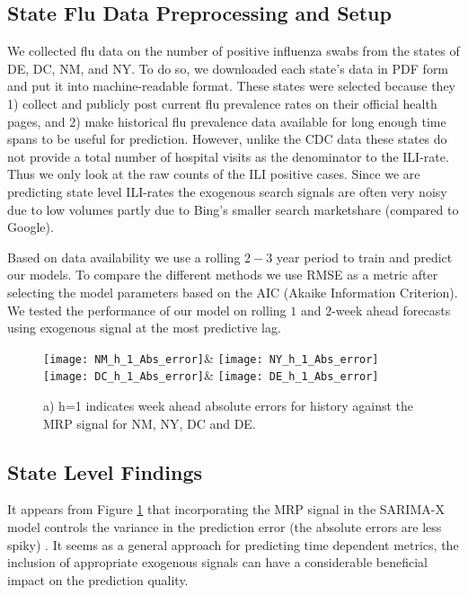 \documentclass[12pt]{article}
\begin{document}
\subsection{State Flu Data Preprocessing and Setup}

We collected flu data on the number of positive influenza swabs from the states of DE, DC, NM, and NY. To do so, we downloaded each state's data in PDF form and put it into machine-readable format. These states were selected because they 1) collect and publicly post current flu prevalence rates on their official health pages, and 2) make historical flu prevalence data available for long enough time spans to be useful for prediction. However, unlike the CDC data these states do not provide a total number of hospital visits as the denominator to the ILI-rate. Thus we only look at the raw counts of the ILI positive cases. Since we are predicting state level ILI-rates the exogenous search signals are often very noisy due to low volumes partly due to Bing's smaller search marketshare (compared to Google).

Based on data availability we use a rolling $2-3$ year period to train and predict our models. To compare the different methods we use RMSE as a metric after selecting the model parameters based on the AIC (Akaike Information Criterion). We tested the performance of our model on rolling $1$ and $2$-week ahead forecasts using exogenous signal at the most predictive lag.

\clearpage

\begin{figure}[h!]
 \centering
 \texttt{[image: NM\_h\_1\_Abs\_error]}&
  \texttt{[image: NY\_h\_1\_Abs\_error]}\\
    \texttt{[image: DC\_h\_1\_Abs\_error]}&
        \texttt{[image: DE\_h\_1\_Abs\_error]}
 \caption{a) h=1 indicates week ahead absolute errors for history against the MRP signal for NM,  NY, DC and DE.}
  \label{fig:State_Abs_Errs}
\end{figure}
\subsection*{State Level Findings}
It appears from Figure \ref{fig:State_Abs_Errs} that incorporating the MRP signal in the SARIMA-X model controls the variance in the prediction error (the absolute errors are less spiky) . It seems as a general approach for predicting time dependent metrics, the inclusion of appropriate exogenous signals can have a considerable beneficial impact on the prediction quality.
\end{document}
